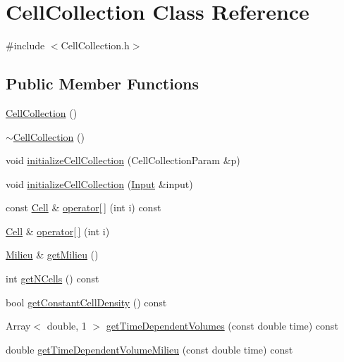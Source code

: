 \hypertarget{class_cell_collection}{\section{\-Cell\-Collection \-Class \-Reference}
\label{class_cell_collection}
}


{\ttfamily \#include $<$\-Cell\-Collection.\-h$>$}

\subsection*{\-Public \-Member \-Functions}
\begin{DoxyCompactItemize}
\item 
\hyperlink{class_cell_collection_a827aba3bcb4e7cad6d6d7a516a311582}{\-Cell\-Collection} ()
\item 
\hyperlink{class_cell_collection_a6fff17151933d645fac4888fe2e442b9}{$\sim$\-Cell\-Collection} ()
\item 
void \hyperlink{class_cell_collection_a6519b89580fb7b9303e840b1d5be9f2b}{initialize\-Cell\-Collection} (\-Cell\-Collection\-Param \&p)
\item 
void \hyperlink{class_cell_collection_a6be072ee4b42b95dfab30367050c0ebd}{initialize\-Cell\-Collection} (\hyperlink{class_input}{\-Input} \&input)
\item 
const \hyperlink{class_cell}{\-Cell} \& \hyperlink{class_cell_collection_a3599c6632ae194366f8823d98fe4ac2e}{operator\mbox{[}$\,$\mbox{]}} (int i) const 
\item 
\hyperlink{class_cell}{\-Cell} \& \hyperlink{class_cell_collection_a3f4df67dc0c0810e56910c7c2c61eee0}{operator\mbox{[}$\,$\mbox{]}} (int i)
\item 
\hyperlink{class_milieu}{\-Milieu} \& \hyperlink{class_cell_collection_a1a05ae2b39fa7d1975fd915ac782b55f}{get\-Milieu} ()
\item 
int \hyperlink{class_cell_collection_a7e7033870c2939e540e384a4e73943be}{get\-N\-Cells} () const 
\item 
bool \hyperlink{class_cell_collection_a66f2a2fe9fdcd5af65b41a7c4bb8e66d}{get\-Constant\-Cell\-Density} () const 
\item 
\-Array$<$ double, 1 $>$ \hyperlink{class_cell_collection_a0c5d702860a478ba49d95ab1315bbc3b}{get\-Time\-Dependent\-Volumes} (const double time) const 
\item 
double \hyperlink{class_cell_collection_a45154c18069e3fd8902eca30def3958a}{get\-Time\-Dependent\-Volume\-Milieu} (const double time) const 

\end{DoxyCompactItemize}
